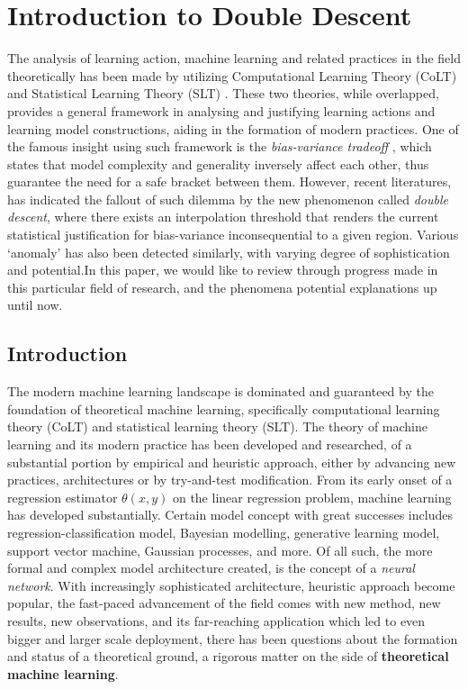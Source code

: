 \chapter{Introduction to Double Descent}

The analysis of learning action, machine learning and related practices in the field theoretically has been made by utilizing Computational Learning Theory (CoLT) \cite{10.1145/1968.1972} and Statistical Learning Theory (SLT) \cite{Vapnik1999-VAPTNO}. These two theories, while overlapped, provides a general framework in analysing and justifying learning actions and learning model constructions, aiding in the formation of modern practices. One of the famous insight using such framework is the \textit{bias-variance tradeoff} \cite{6797087}, which states that model complexity and generality inversely affect each other, thus guarantee the need for a safe bracket between them. However, recent literatures, \cite{belkin_reconciling_2019} has indicated the fallout of such dilemma by the new phenomenon called \textit{double descent}, where there exists an interpolation threshold that renders the current statistical justification for bias-variance inconsequential to a given region. Various `anomaly' has also been detected similarly, with varying degree of sophistication and potential.In this paper, we would like to review through progress made in this particular field of research, and the phenomena potential explanations up until now. 

\section{Introduction}

The modern machine learning landscape is dominated and guaranteed by the foundation of theoretical machine learning, specifically computational learning theory (CoLT) and statistical learning theory (SLT). The theory of machine learning and its modern practice has been developed and researched, of a substantial portion by empirical and heuristic approach, either by advancing new practices, architectures or by try-and-test modification. From its early onset of a regression estimator $\theta(x,y)$ on the linear regression problem, machine learning has developed substantially. Certain model concept with great successes includes regression-classification model, Bayesian modelling, generative learning model, support vector machine, Gaussian processes, and more. Of all such, the more formal and complex model architecture created, is the concept of a \textit{neural network}. With increasingly sophisticated architecture, heuristic approach become popular, the fast-paced advancement of the field comes with new method, new results, new observations, and its far-reaching application which led to even bigger and larger scale deployment, there has been questions about the formation and status of a theoretical ground, a rigorous matter on the side of \textbf{theoretical machine learning}.

